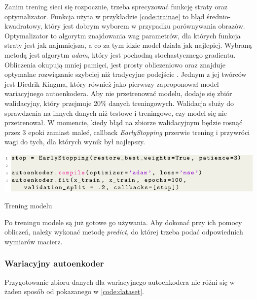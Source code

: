 \documentclass[a4paper,12pt,oneside]{book} %
\begin{document}
Zanim trening sieci się rozpocznie, trzeba sprecyzować funkcję straty oraz optymalizator. Funkcja użyta w przykładzie \ref{code:trainae} to błąd średnio-kwadratowy, który jest dobrym wyborem w przypadku porównywania obrazów. Optymalizator to algorytm znajdowania wag parametrów, dla których funkcja straty jest jak najmniejsza, a co za tym idzie model działa jak najlepiej. Wybraną metodą jest algorytm \textit{adam}, który jest pochodną stochastycznego gradientu. Obliczenia okupują mniej pamięci, jest prosty obliczeniowo oraz znajduje optymalne rozwiązanie szybciej niż tradycyjne podejście \cite{adam}. Jednym z jej twórców jest Diedrik Kingma, który również jako pierwszy zaproponował model wariacyjnego autoenkodera. Aby nie przetrenować modelu, dodaje się zbiór walidacyjny, który przejmuje 20\% danych treningowych. Walidacja służy do sprawdzenia na innych danych niż testowe i treningowe, czy model się nie przetrenował. W momencie, kiedy błąd na zbiorze walidacyjnym będzie rosnąć przez 3 epoki zamiast maleć, callback \textit{EarlyStopping} przerwie trening i przywróci wagi do tych, dla których wynik był najlepszy.
\begin{code}[h!]
	\centering
	\includegraphics[width=\linewidth]{trainae.pdf}
	\caption{Trening modelu}
	\label{code:trainae}
\end{code}

Po treningu modele są już gotowe go używania. Aby dokonać przy ich pomocy obliczeń, należy wykonać metodę \textit{predict}, do której trzeba podać odpowiednich wymiarów macierz. 
\subsubsection{Wariacyjny autoenkoder}
Przygotowanie zbioru danych dla wariacyjnego autoenkodera nie różni się w żaden sposób od pokazanego w \ref{code:dataset}. 
\end{document}
